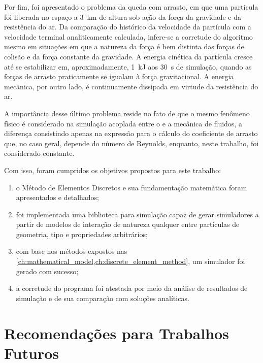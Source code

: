 Por fim, foi apresentado o problema da queda com arrasto, em que uma partícula foi liberada no espaço a \SI{3}{\kilo\meter} de altura sob ação da força da gravidade e da resistência do ar. Da comparação do histórico da velocidade da partícula com a velocidade terminal analiticamente calculada, infere-se a corretude do algoritmo mesmo em situações em que a natureza da força é bem distinta das forças de colisão e da força constante da gravidade. A energia cinética da partícula cresce até se estabilizar em, aproximadamente, \SI{1}{\kilo\joule} aos \SI{30}{\second} de simulação, quando as forças de arrasto praticamente se igualam à força gravitacional. A energia mecânica, por outro lado, é continuamente dissipada em virtude da resistência do ar.

A importância desse último problema reside no fato de que o mesmo fenômeno físico é considerado na simulação acoplada entre o \DEM{} e a mecânica de fluidos, a diferença consistindo apenas na expressão para o cálculo do coeficiente de arrasto que, no caso geral, depende do número de Reynolds, enquanto, neste trabalho, foi considerado constante.

Com isso, foram cumpridos os objetivos propostos para este trabalho:
\begin{enumerate}
\item o Método de Elementos Discretos e sua fundamentação matemática foram apresentados e detalhados;
\item foi implementada uma biblioteca para simulação \DEM{} capaz de gerar simuladores a partir de modelos de interação de natureza qualquer entre partículas de geometria, tipo e propriedades arbitrários;
\item com base nos métodos expostos nas \cref{ch:mathematical_model,ch:discrete_element_method}, um simulador foi gerado com sucesso;
\item a corretude do programa foi atestada por meio da análise de resultados de simulação e de sua comparação com soluções analíticas.
\end{enumerate}

\section{Recomendações para Trabalhos Futuros}

